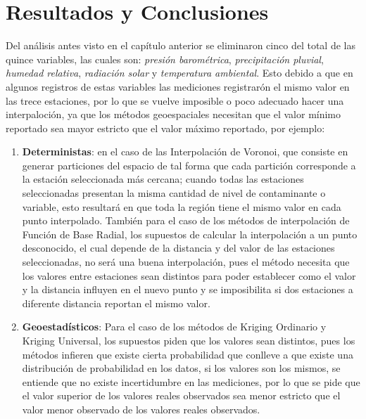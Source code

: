 \chapter{Resultados y Conclusiones}

Del análisis antes visto en el capítulo anterior se eliminaron cinco del total de las quince variables, las cuales son: {\em presión barométrica}, {\em precipitación pluvial}, {\em humedad relativa}, {\em radiación solar} y {\em temperatura ambiental}. Esto debido a que en algunos registros de estas variables las mediciones registrarón el mismo valor en las trece estaciones, por lo que se vuelve imposible o poco adecuado hacer una interpaloción, ya que los métodos geoespaciales necesitan que el valor mínimo reportado sea mayor estricto que el valor máximo reportado, por ejemplo:

\begin{enumerate}
\item {\bf Deterministas}: en el caso de las Interpolación de Voronoi, que consiste en generar particiones del espacio de tal forma que cada partición corresponde a la estación seleccionada más cercana; cuando todas las estaciones seleccionadas presentan la misma cantidad de nivel de contaminante o variable, esto resultará en que toda la región tiene el mismo valor en cada punto interpolado. También para el caso de los métodos de interpolación de Función de Base Radial, los supuestos de calcular la interpolación a un punto desconocido, el cual depende de la distancia y del valor de las estaciones seleccionadas, no será una buena interpolación, pues el método necesita que los valores entre estaciones sean distintos para poder establecer como el valor y la distancia influyen en el nuevo punto y se imposibilita si dos estaciones a diferente distancia reportan el mismo valor.

\item {\bf Geoestadísticos}: Para el caso de los métodos de Kriging Ordinario y Kriging Universal, los supuestos piden que los valores sean distintos, pues los métodos infieren que existe cierta probabilidad que conlleve a que existe una distribución de probabilidad en los datos, si los valores son los mismos, se entiende que no existe incertidumbre en las mediciones, por lo que se pide que el valor superior de los valores reales observados sea menor estricto que el valor menor observado de los valores reales observados.
\end{enumerate}

